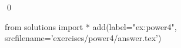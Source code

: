 
\begin{ex} 
  \label{ex:power4}
  
  \qed
\end{ex} 
\begin{python0}
from solutions import *
add(label="ex:power4",
    srcfilename='exercises/power4/answer.tex') 
\end{python0}
